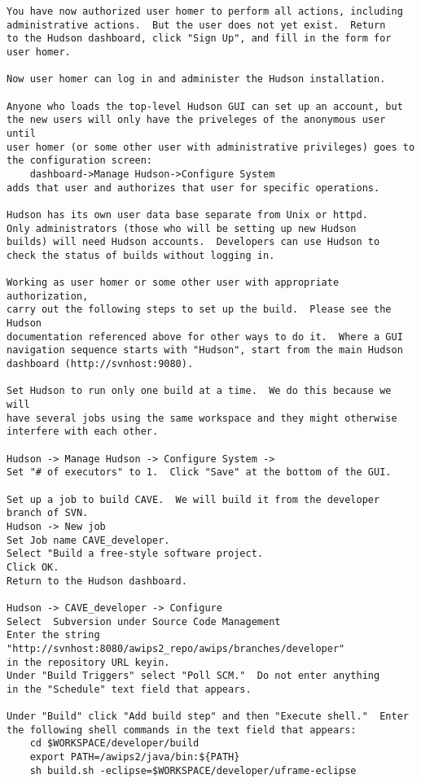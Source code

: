 \begin{verbatim}
You have now authorized user homer to perform all actions, including
administrative actions.  But the user does not yet exist.  Return
to the Hudson dashboard, click "Sign Up", and fill in the form for
user homer.

Now user homer can log in and administer the Hudson installation.

Anyone who loads the top-level Hudson GUI can set up an account, but
the new users will only have the priveleges of the anonymous user until
user homer (or some other user with administrative privileges) goes to
the configuration screen:
    dashboard->Manage Hudson->Configure System
adds that user and authorizes that user for specific operations.

Hudson has its own user data base separate from Unix or httpd.
Only administrators (those who will be setting up new Hudson
builds) will need Hudson accounts.  Developers can use Hudson to 
check the status of builds without logging in.

Working as user homer or some other user with appropriate authorization,
carry out the following steps to set up the build.  Please see the Hudson
documentation referenced above for other ways to do it.  Where a GUI
navigation sequence starts with "Hudson", start from the main Hudson
dashboard (http://svnhost:9080).

Set Hudson to run only one build at a time.  We do this because we will
have several jobs using the same workspace and they might otherwise
interfere with each other.

Hudson -> Manage Hudson -> Configure System -> 
Set "# of executors" to 1.  Click "Save" at the bottom of the GUI.

Set up a job to build CAVE.  We will build it from the developer 
branch of SVN.
Hudson -> New job
Set Job name CAVE_developer.
Select "Build a free-style software project.
Click OK.
Return to the Hudson dashboard.

Hudson -> CAVE_developer -> Configure
Select  Subversion under Source Code Management
Enter the string "http://svnhost:8080/awips2_repo/awips/branches/developer"
in the repository URL keyin.  
Under "Build Triggers" select "Poll SCM."  Do not enter anything 
in the "Schedule" text field that appears.

Under "Build" click "Add build step" and then "Execute shell."  Enter 
the following shell commands in the text field that appears:
    cd $WORKSPACE/developer/build
    export PATH=/awips2/java/bin:${PATH}
    sh build.sh -eclipse=$WORKSPACE/developer/uframe-eclipse


\end{verbatim}
